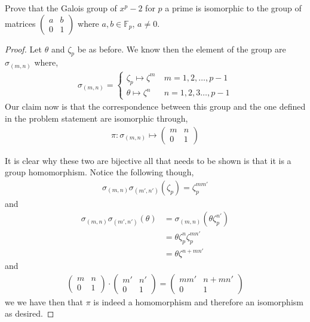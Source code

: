 \documentclass[11pt]{article}
\newenvironment{problem}[2][Problem\!]{\begin{tcolorbox}\begin{trivlist}
\item[\hskip \labelsep {\bfseries #1}\hskip \labelsep {\bfseries #2}]}{\end{trivlist}\end{tcolorbox}}
\newcommand{\ff}{\mathbb F}   %
\begin{document}
\vspace*{20pt}
\begin{problem}{14.2.5}
  Prove that the Galois group of $x^{p} - 2$ for $p$ a prime is isomorphic to the group of matrices $\begin{pmatrix}
    a & b \\ 0 & 1
  \end{pmatrix}$ where $a,b \in \ff_p$, $a\neq 0$.
\end{problem}
\begin{proof}
  Let $\theta$  and $\zeta_p$ be as before. We know then the element of the group are $\sigma_{(m,n)}$ where,
  \begin{align*}
    \sigma_{(m,n)} = \begin{cases}
      \zeta_p \mapsto \zeta^{m} \ &m = 1,2, \dots, p-1 \\
      \theta \mapsto \zeta^{n} \ &n = 1,2,3 \dots , p-1
    \end{cases}
  \end{align*} 
  Our claim now is that the correspondence between this group and the one defined in the problem statement are isomorphic through,
  \begin{align*}
    \pi: \sigma_{(m,n)} \mapsto \begin{pmatrix}
      m & n \\ 0 & 1
    \end{pmatrix}
  \end{align*}
  
  It is clear why these two are bijective all that needs to be shown is that it is a group homomorphism. Notice the following though,
  \begin{align*}
    \sigma_{(m,n)}\sigma_{(m',n')}(\zeta_p) = \zeta_p^{m m'}   
  \end{align*}
  and 
  \begin{align*}
    \sigma_{(m,n)}\sigma_{(m',n')}(\theta) &= \sigma_{(m,n)}(\theta\zeta_p^{n'}) \\
    &= \theta\zeta_p^{n}\zeta_p^{m n'}\\
    &= \theta\zeta^{n + m  n'}
  \end{align*}
  and
  \begin{align*}
    \begin{pmatrix}
      m & n \\ 0 & 1
    \end{pmatrix}\cdot \begin{pmatrix}
      m' & n' \\ 0 & 1
    \end{pmatrix} = \begin{pmatrix}
      m m' & n + mn' \\
      0 & 1
    \end{pmatrix}
  \end{align*}
  we we have then that $\pi$ is indeed a homomorphism and therefore an isomorphism as desired.  
\end{proof}
\end{document}
